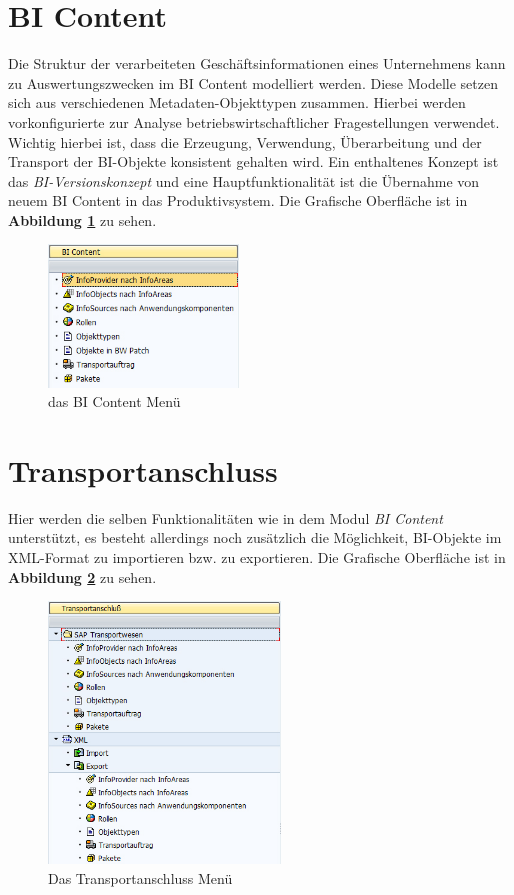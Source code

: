\pagebreak

\section{BI Content} Die Struktur der verarbeiteten Geschäftsinformationen eines Unternehmens kann zu Auswertungszwecken im BI Content modelliert werden. Diese Modelle setzen sich aus verschiedenen Metadaten-Objekttypen zusammen. Hierbei werden vorkonfigurierte zur Analyse betriebswirtschaftlicher Fragestellungen verwendet. Wichtig hierbei ist, dass die Erzeugung, Verwendung, Überarbeitung und der Transport der BI-Objekte konsistent gehalten wird. Ein enthaltenes Konzept ist das \textit{BI-Versionskonzept} und eine Hauptfunktionalität ist die Übernahme von neuem BI Content in das Produktivsystem.
Die Grafische Oberfläche ist in \textbf{Abbildung \ref{pic:BIContent}} zu sehen.
\begin{figure}[H]
    \centering
    \includegraphics[width=0.45\textwidth]{files/BIContent}
    \caption{das BI Content Menü}
    \label{pic:BIContent}
\end{figure}

\pagebreak

\section{Transportanschluss} 
Hier werden die selben Funktionalitäten wie in dem Modul \textit{BI Content} unterstützt, es besteht allerdings noch zusätzlich die Möglichkeit, BI-Objekte im XML-Format zu importieren bzw. zu exportieren.
Die Grafische Oberfläche ist in \textbf{Abbildung \ref{pic:Transportanschluss}} zu sehen.
\begin{figure}[H]
    \centering
    \includegraphics[width=0.55\textwidth]{files/Transportanschluss}
    \caption{Das Transportanschluss Menü}
    \label{pic:Transportanschluss}
\end{figure}

